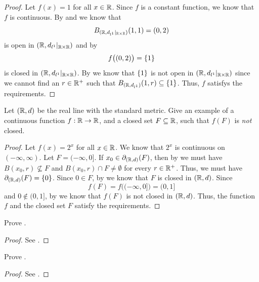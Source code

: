 \begin{proof}
  Let \(f(x) = 1\) for all \(x \in \mathbb{R}\).
  Since \(f\) is a constant function, we know that \(f\) is continuous.
  By  and  we know that
  \[
    B_{(\mathbb{R}, d_{l^1}|_{\mathbb{R} \times \mathbb{R}})}(1, 1) = (0, 2)
  \]
  is open in \((\mathbb{R}, d_{l^1}|_{\mathbb{R} \times \mathbb{R}})\) and by 
  \[
    f\big((0, 2)\big) = \left\lbrace1\right\rbrace
  \]
  is closed in \((\mathbb{R}, d_{l^1}|_{\mathbb{R} \times \mathbb{R}})\).
  By  we know that \(\left\lbrace1\right\rbrace\) is not open in \((\mathbb{R}, d_{l^1}|_{\mathbb{R} \times \mathbb{R}})\) since we cannot find an \(r \in \mathbb{R}^+\) such that \(B_{(\mathbb{R}, d_{l^1})}(1, r) \subseteq \left\lbrace1\right\rbrace\).
  Thus, \(f\) satisfys the requirements.
\end{proof}

\begin{ex}\label{ii:ex:1.5.5}
  Let \((\mathbb{R}, d)\) be the real line with the standard metric.
  Give an example of a continuous function \(f : \mathbb{R} \to \mathbb{R}\), and a closed set \(F \subseteq \mathbb{R}\), such that \(f(F)\) is \emph{not} closed.
\end{ex}

\begin{proof}
  Let \(f(x) = 2^x\) for all \(x \in \mathbb{R}\).
  We know that \(2^x\) is continuous on \((-\infty, \infty)\).
  Let \(F = (-\infty, 0]\).
  If \(x_0 \in \partial_{(\mathbb{R}, d)}(F)\), then by  we must have \(B(x_0, r) \not\subseteq F\) and \(B(x_0, r) \cap F \neq \emptyset\) for every \(r \in \mathbb{R}^+\).
  Thus, we must have \(\partial_{(\mathbb{R}, d)}(F) = \left\lbrace0\right\rbrace\).
  Since \(0 \in F\), by  we know that \(F\) is closed in \((\mathbb{R}, d)\).
  Since
  \[
    f(F) = f\big((-\infty, 0]\big) = (0, 1]
  \]
  and \(0 \notin (0, 1]\), by  we know that \(f(F)\) is not closed in \((\mathbb{R}, d)\).
  Thus, the function \(f\) and the closed set \(F\) satisfy the requirements.
\end{proof}

\begin{ex}\label{ii:ex:1.5.6}
  Prove .
\end{ex}

\begin{proof}
  See .
\end{proof}

\begin{ex}\label{ii:ex:1.5.7}
  Prove .
\end{ex}

\begin{proof}
  See .
\end{proof}

